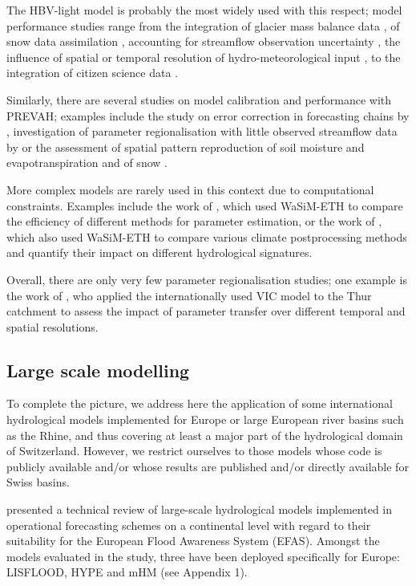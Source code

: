 \documentclass[10pt,a4paper]{article}
\begin{document}
The HBV-light model is probably the most widely used with this respect;
model performance studies range from the integration of glacier mass
balance data \citep{Finger2015,schaeflihuss11}, of snow data
assimilation \citep{Griessinger2016}, accounting for streamflow observation
uncertainty \citep{Westerberg2020}, the influence of spatial or temporal
resolution of hydro-meteorological input \citep{GironsLopez2016,Sikorska2018}, to the
integration of citizen science data \citep{Etter2020}.

Similarly, there are several studies on model calibration and
performance with PREVAH; examples include the study on error correction
in forecasting chains by \citet{Bogner_2018}, investigation of parameter
regionalisation with little observed streamflow data
by \citet{Viviroli2015} or the assessment of spatial pattern reproduction
of soil moisture and evapotranspiration \citep{Zappa2003} and of snow
\citep{Zappa2008a}.

More complex models are rarely used in this context due to computational
constraints. Examples include the work of \citet{Cullmann2011}, which
used WaSiM-ETH to compare the efficiency of different methods for
parameter estimation, or the work of \citet{Rossler2019}, which also
used WaSiM-ETH to compare various climate postprocessing methods and
quantify their impact on different hydrological signatures. 

Overall, there are only very few parameter regionalisation studies; one
example is the work of \citet{Melsen2016}, who applied the
internationally used VIC model to the Thur catchment to assess the
impact of parameter transfer over different temporal and spatial
resolutions.

\subsection{Large scale modelling}
\label{sec:application:largescale}

To complete the picture, we address here the application of some
international hydrological models implemented for Europe or large
European river basins such as the Rhine, and thus covering at least a
major part of the hydrological domain of Switzerland. However, we
restrict ourselves to those models whose code is publicly available
and/or whose results are published and/or directly available for Swiss
basins. 

\citet{Kauffeldt_2016} presented a technical review of large-scale
hydrological models implemented in operational forecasting schemes on a
continental level with regard to their suitability for the European
Flood Awareness System (EFAS). Amongst the models evaluated in the
study, three have been deployed specifically for Europe: LISFLOOD, HYPE
and mHM (see Appendix 1).
\end{document}
